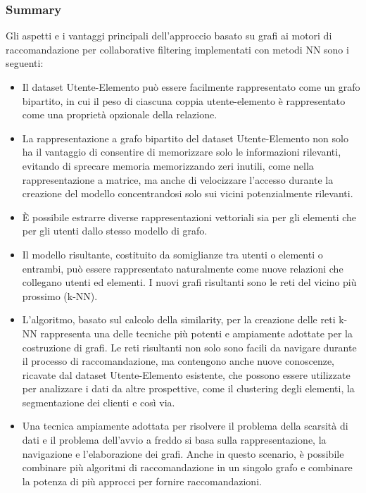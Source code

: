 \subsubsection*{Summary}
Gli aspetti e i vantaggi principali dell'approccio basato su grafi ai motori di raccomandazione per collaborative filtering implementati con metodi NN sono i seguenti:
\begin{itemize}
    \item Il dataset Utente-Elemento può essere facilmente rappresentato come un grafo bipartito, in cui il peso di ciascuna coppia utente-elemento è rappresentato come una proprietà opzionale della relazione.
    \item La rappresentazione a grafo bipartito del dataset Utente-Elemento non solo ha il vantaggio di consentire di memorizzare solo le informazioni rilevanti, evitando di sprecare memoria memorizzando zeri inutili, come nella rappresentazione a matrice, ma anche di velocizzare l'accesso durante la creazione del modello concentrandosi solo sui vicini potenzialmente rilevanti.
    \item È possibile estrarre diverse rappresentazioni vettoriali sia per gli elementi che per gli utenti dallo stesso modello di grafo.
    \item Il modello risultante, costituito da somiglianze tra utenti o elementi o entrambi, può essere rappresentato naturalmente come nuove relazioni che collegano utenti ed elementi. I nuovi grafi risultanti sono le reti del vicino più prossimo (k-NN).
    \item L'algoritmo, basato sul calcolo della similarity, per la creazione delle reti k-NN rappresenta una delle tecniche più potenti e ampiamente adottate per la costruzione di grafi. Le reti risultanti non solo sono facili da navigare durante il processo di raccomandazione, ma contengono anche nuove conoscenze, ricavate dal dataset Utente-Elemento esistente, che possono essere utilizzate per analizzare i dati da altre prospettive, come il clustering degli elementi, la segmentazione dei clienti e così via.
    \item Una tecnica ampiamente adottata per risolvere il problema della scarsità di dati e il problema dell'avvio a freddo si basa sulla rappresentazione, la navigazione e l'elaborazione dei grafi. Anche in questo scenario, è possibile combinare più algoritmi di raccomandazione in un singolo grafo e combinare la potenza di più approcci per fornire raccomandazioni.
\end{itemize} 


